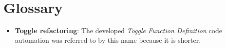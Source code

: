\chapter{Glossary}
\thispagestyle{fancy}

\begin{itemize}
\item \textbf{Toggle refactoring}: The developed \textit{Toggle Function Definition} code automation was referred to by this name because it is shorter.
\end{itemize}

